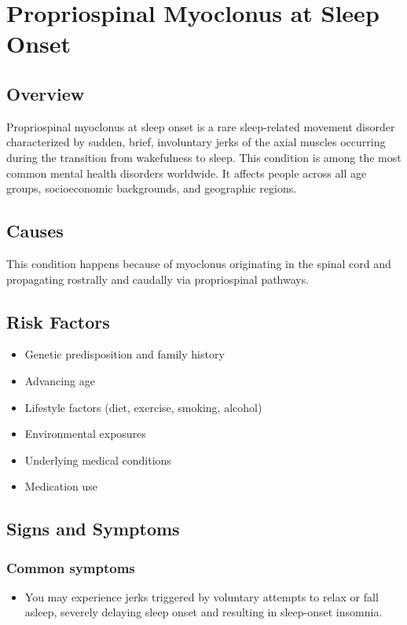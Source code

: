 \chapter{Propriospinal Myoclonus at Sleep Onset}
\label{sec:Propriospinal Myoclonus at Sleep Onset}

\section{Overview}
Propriospinal myoclonus at sleep onset is a rare sleep-related movement disorder characterized by sudden, brief, involuntary jerks of the axial muscles occurring during the transition from wakefulness to sleep. This condition is among the most common mental health disorders worldwide. It affects people across all age groups, socioeconomic backgrounds, and geographic regions.
\section{Causes}
This condition happens because of myoclonus originating in the spinal cord and propagating rostrally and caudally via propriospinal pathways.     
\section{Risk Factors}

\begin{itemize}[noitemsep]
  \item Genetic predisposition and family history
  \item Advancing age
  \item Lifestyle factors (diet, exercise, smoking, alcohol)
  \item Environmental exposures
  \item Underlying medical conditions
  \item Medication use
\end{itemize}
\section{Signs and Symptoms}

\subsection{Common symptoms}
\begin{itemize}[noitemsep]
  \item You may experience jerks triggered by voluntary attempts to relax or fall asleep, severely delaying sleep onset and resulting in sleep-onset insomnia. 
  \end{itemize}

